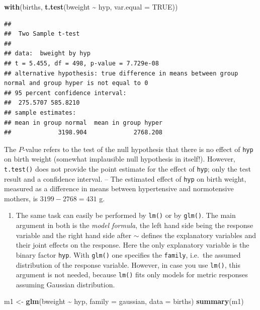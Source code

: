 \documentclass[
]{book}
\newenvironment{Shaded}{\begin{snugshade}}{\end{snugshade}}
\newcommand{\AttributeTok}[1]{\textcolor[rgb]{0.13,0.29,0.53}{#1}}
\newcommand{\ConstantTok}[1]{\textcolor[rgb]{0.56,0.35,0.01}{#1}}
\newcommand{\FunctionTok}[1]{\textcolor[rgb]{0.13,0.29,0.53}{\textbf{#1}}}
\newcommand{\NormalTok}[1]{#1}
\newcommand{\OtherTok}[1]{\textcolor[rgb]{0.56,0.35,0.01}{#1}}
\newcommand{\SpecialCharTok}[1]{\textcolor[rgb]{0.81,0.36,0.00}{\textbf{#1}}}
\providecommand{\tightlist}{%
  \setlength{\itemsep}{0pt}\setlength{\parskip}{0pt}}
\begin{document}
\begin{Shaded}
\begin{Highlighting}[]
\FunctionTok{with}\NormalTok{(births, }\FunctionTok{t.test}\NormalTok{(bweight }\SpecialCharTok{\textasciitilde{}}\NormalTok{ hyp, }\AttributeTok{var.equal =} \ConstantTok{TRUE}\NormalTok{))}
\end{Highlighting}
\end{Shaded}

\begin{verbatim}
## 
##  Two Sample t-test
## 
## data:  bweight by hyp
## t = 5.455, df = 498, p-value = 7.729e-08
## alternative hypothesis: true difference in means between group normal and group hyper is not equal to 0
## 95 percent confidence interval:
##  275.5707 585.8210
## sample estimates:
## mean in group normal  mean in group hyper 
##             3198.904             2768.208
\end{verbatim}

The \(P\)-value refers to the test
of the null hypothesis that there is no effect of \texttt{hyp} on birth weight
(somewhat implausible null hypothesis in itself!).
However, \texttt{t.test()} does not provide
the point estimate for the effect of \texttt{hyp}; only the test result and a confidence interval. -- The estimated effect of \texttt{hyp} on birth weight,
measured as a difference in means between hypertensive and normotensive
mothers,
is \(3199-2768 = 431\) g.

\begin{enumerate}
\def\labelenumi{\arabic{enumi}.}
\setcounter{enumi}{1}
\tightlist
\item
  The same task can easily be performed by \texttt{lm()} or by \texttt{glm()}.
  The main argument in both
  is the \emph{model formula}, the left hand side being the response variable
  and the right hand side
  after \(\sim\) defines the explanatory variables and their
  joint effects on the response. Here the only
  explanatory variable is the binary factor \texttt{hyp}. With \texttt{glm()} one specifies the
  \texttt{family}, i.e.~the assumed distribution of the response variable. However,
  in case you use
  \texttt{lm()}, this argument is not needed, because \texttt{lm()} fits only
  models for metric responses assuming Gaussian distribution.
\end{enumerate}

\begin{Shaded}
\begin{Highlighting}[]
\NormalTok{m1 }\OtherTok{\textless{}{-}} \FunctionTok{glm}\NormalTok{(bweight }\SpecialCharTok{\textasciitilde{}}\NormalTok{ hyp, }\AttributeTok{family =}\NormalTok{ gaussian, }\AttributeTok{data =}\NormalTok{ births)}
\FunctionTok{summary}\NormalTok{(m1)}
\end{Highlighting}
\end{Shaded}
\end{document}
